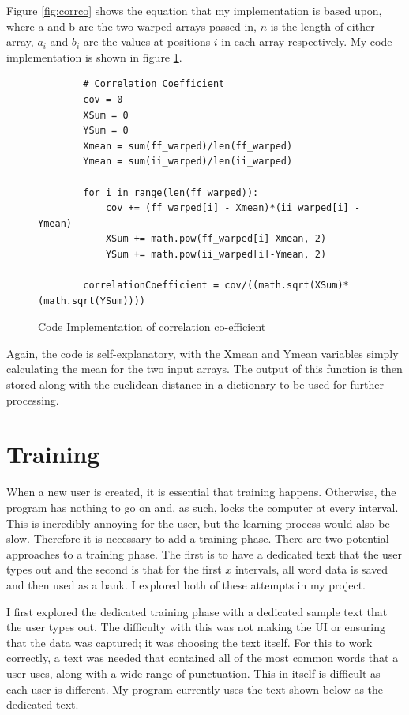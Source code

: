 \documentclass[10pt,a4paper]{report}
\begin{document}
Figure \ref{fig:corrco} shows the equation that my implementation is based upon, where a and b are the two warped arrays passed in, \(n\) is the length of either array, \(a_i\) and \(b_i\) are the values at positions \(i\) in each array respectively. My code implementation is shown in figure \ref{fig:CodeCorr}.

\begin{figure}[h!]
	\begin{lstlisting}
		# Correlation Coefficient
        cov = 0
        XSum = 0
        YSum = 0
        Xmean = sum(ff_warped)/len(ff_warped)
        Ymean = sum(ii_warped)/len(ii_warped)
                    
       	for i in range(len(ff_warped)):
        	cov += (ff_warped[i] - Xmean)*(ii_warped[i] - Ymean)
            XSum += math.pow(ff_warped[i]-Xmean, 2)
            YSum += math.pow(ii_warped[i]-Ymean, 2)
                            
        correlationCoefficient = cov/((math.sqrt(XSum)*(math.sqrt(YSum))))
       \end{lstlisting}
       \caption{Code Implementation of correlation co-efficient}
       \label{fig:CodeCorr}
\end{figure}

Again, the code is self-explanatory, with the Xmean and Ymean variables simply calculating the mean for the two input arrays. The output of this function is then stored along with the euclidean distance in a dictionary to be used for further processing.

\section{Training}
When a new user is created, it is essential that training happens. Otherwise, the program has nothing to go on and, as such, locks the computer at every interval. This is incredibly annoying for the user, but the learning process would also be slow. Therefore it is necessary to add a training phase. There are two potential approaches to a training phase. The first is to have a dedicated text that the user types out and the second is that for the first \(x\) intervals, all word data is saved and then used as a bank. I explored both of these attempts in my project. 

I first explored the dedicated training phase with a dedicated sample text that the user types out. The difficulty with this was not making the UI or ensuring that the data was captured; it was choosing the text itself. For this to work correctly, a text was needed that contained all of the most common words that a user uses, along with a wide range of punctuation. This in itself is difficult as each user is different. My program currently uses the text shown below as the dedicated text.
\end{document}
